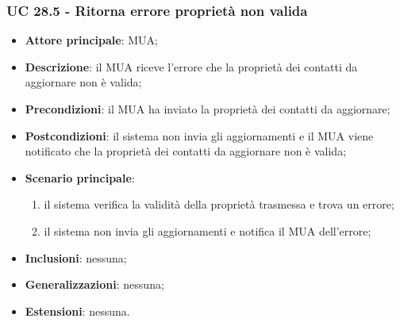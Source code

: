     \subsubsection{UC 28.5 - Ritorna errore proprietà non valida} \label{sec:UC28.5}
    \begin{itemize}
        \item \textbf{Attore principale}: MUA;
        \item \textbf{Descrizione}: il MUA riceve l'errore che la proprietà dei contatti da aggiornare non è valida;
        \item \textbf{Precondizioni}: il MUA ha inviato la proprietà dei contatti da aggiornare;
        \item \textbf{Postcondizioni}: il sistema non invia gli aggiornamenti e il MUA viene notificato che la proprietà dei contatti da aggiornare non è valida;
        \item \textbf{Scenario principale}:
            \begin{enumerate}
                \item il sistema verifica la validità della proprietà trasmessa e trova un errore;
                \item il sistema non invia gli aggiornamenti e notifica il MUA dell'errore;
            \end{enumerate}
        \item \textbf{Inclusioni}: nessuna;
        \item \textbf{Generalizzazioni}: nessuna;
        \item \textbf{Estensioni}: nessuna.
    \end{itemize}